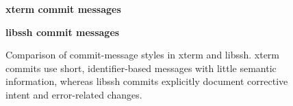 \begin{figure}[t]
\centering
\begin{minipage}{0.45\linewidth}
\centering
\textbf{xterm commit messages}
\vspace{0.3em}

\end{minipage}
\hfill
\begin{minipage}{0.45\linewidth}
\centering
\textbf{libssh commit messages}
\vspace{0.3em}

\end{minipage}

\caption{Comparison of commit-message styles in xterm and libssh. 
xterm commits use short, identifier-based messages with little semantic information, 
whereas libssh commits explicitly document corrective intent and error-related changes.}
\label{fig:commit-message-comparison}
\end{figure}


